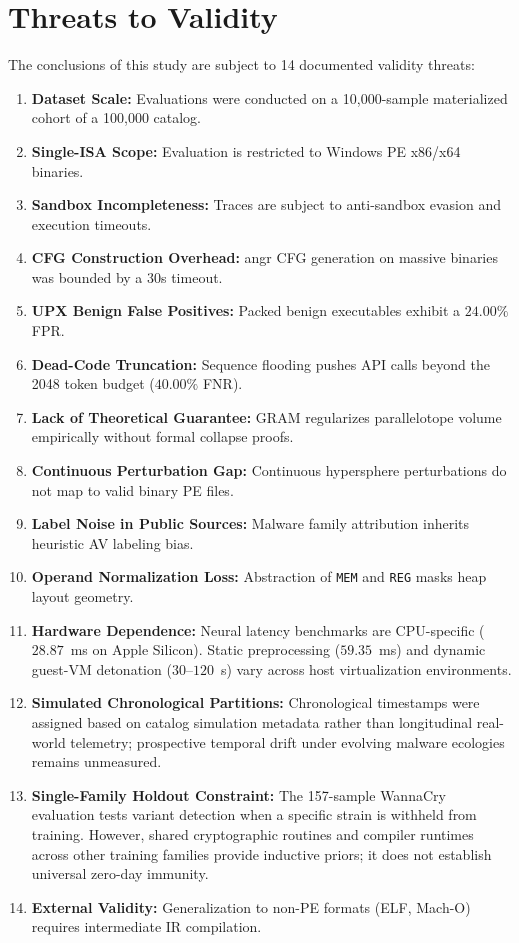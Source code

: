 \documentclass[pdflatex,sn-mathphys-num]{sn-jnl}
\begin{document}
\section{Threats to Validity}\label{sec:validity}
The conclusions of this study are subject to 14 documented validity threats:
\begin{enumerate}
    \item \textbf{Dataset Scale:} Evaluations were conducted on a 10,000-sample materialized cohort of a 100,000 catalog.
    \item \textbf{Single-ISA Scope:} Evaluation is restricted to Windows PE x86/x64 binaries.
    \item \textbf{Sandbox Incompleteness:} Traces are subject to anti-sandbox evasion and execution timeouts.
    \item \textbf{CFG Construction Overhead:} angr CFG generation on massive binaries was bounded by a 30s timeout.
    \item \textbf{UPX Benign False Positives:} Packed benign executables exhibit a $24.00\%$ FPR.
    \item \textbf{Dead-Code Truncation:} Sequence flooding pushes API calls beyond the 2048 token budget ($40.00\%$ FNR).
    \item \textbf{Lack of Theoretical Guarantee:} GRAM regularizes parallelotope volume empirically without formal collapse proofs.
    \item \textbf{Continuous Perturbation Gap:} Continuous hypersphere perturbations do not map to valid binary PE files.
    \item \textbf{Label Noise in Public Sources:} Malware family attribution inherits heuristic AV labeling bias.
    \item \textbf{Operand Normalization Loss:} Abstraction of \texttt{MEM} and \texttt{REG} masks heap layout geometry.
    \item \textbf{Hardware Dependence:} Neural latency benchmarks are CPU-specific ($28.87$~ms on Apple Silicon). Static preprocessing ($59.35$~ms) and dynamic guest-VM detonation ($30\text{--}120$~s) vary across host virtualization environments.
    \item \textbf{Simulated Chronological Partitions:} Chronological timestamps were assigned based on catalog simulation metadata rather than longitudinal real-world telemetry; prospective temporal drift under evolving malware ecologies remains unmeasured.
    \item \textbf{Single-Family Holdout Constraint:} The 157-sample WannaCry evaluation tests variant detection when a specific strain is withheld from training. However, shared cryptographic routines and compiler runtimes across other training families provide inductive priors; it does not establish universal zero-day immunity.
    \item \textbf{External Validity:} Generalization to non-PE formats (ELF, Mach-O) requires intermediate IR compilation.
\end{enumerate}
\end{document}
